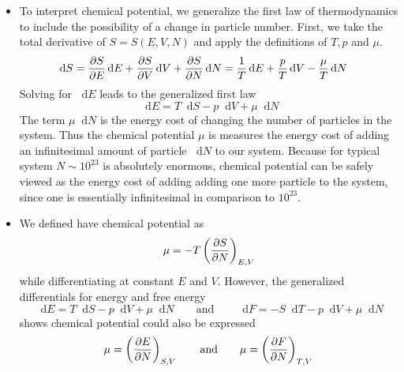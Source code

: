 \documentclass[11pt, a4paper]{article}
\newcommand{\eqtext}[1]{\qquad \text{#1} \qquad}
\newcommand{\diff}{\mathop{}\!\mathrm{d}} %
\newcommand{\pdveval}[3]{\left(\pdv{#1}{#2}\right)_{#3}}
\begin{document}
\begin{itemize}
	\item To interpret chemical potential, we generalize the first law of thermodynamics to include the possibility of a change in particle number. First, we take the total derivative of $ S = S(E, V, N) $ and apply the definitions of $ T, p $ and $ \mu $.
	\begin{align*}
		\diff S &= \pdv{S}{E}\diff E + \pdv{S}{V}\diff V + \pdv{S}{N}\diff N = \frac{1}{T}\diff E + \frac{p}{T}\diff V - \frac{\mu}{T}\diff N
	\end{align*}
	Solving for $ \diff E $ leads to the generalized first law
	\begin{equation*}
		\diff E = T \diff S - p\diff V + \mu \diff N
	\end{equation*}
	The term $ \mu \diff N $ is the energy cost of changing the number of particles in the system. Thus the chemical potential $ \mu $ is measures the energy cost of adding an infinitesimal amount of particle $ \diff N $ to our system. Because for typical system $ N \sim 10^{23} $ is absolutely enormous, chemical potential can be safely viewed as the energy cost of adding adding one more particle to the system, since one is essentially infinitesimal in comparison to $ 10^{23} $.

	\item We defined have chemical potential as 
	\begin{equation*}
		\mu = -T \pdveval{S}{N}{E, V}
	\end{equation*}
	while differentiating at constant $ E $ and $ V $. However, the generalized differentials for energy and free energy
	\begin{equation*}
		\diff E = T \diff S - p\diff V + \mu \diff N \eqtext{and} \diff F = - S \diff T - p\diff V + \mu \diff N
	\end{equation*}
	shows chemical potential could also be expressed 
	\begin{equation*}
		\mu = \pdveval{E}{N}{S, V} \eqtext{and} \mu = \pdveval{F}{N}{T, V}
	\end{equation*}

	
\end{itemize}
\end{document}
